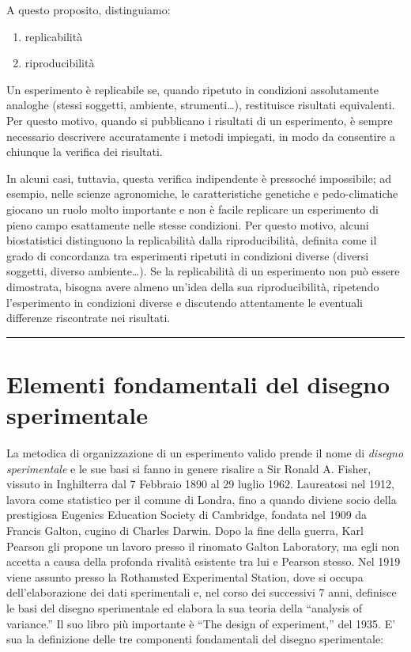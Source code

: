 \documentclass[a4paper,12pt,oneside]{book}
\providecommand{\tightlist}{%
  \setlength{\itemsep}{0pt}\setlength{\parskip}{0pt}}
\begin{document}
A questo proposito, distinguiamo:

\begin{enumerate}
\def\labelenumi{\arabic{enumi}.}
\tightlist
\item
  replicabilità
\item
  riproducibilità
\end{enumerate}

Un esperimento è replicabile se, quando ripetuto in condizioni assolutamente analoghe (stessi soggetti, ambiente, strumenti\ldots), restituisce risultati equivalenti. Per questo motivo, quando si pubblicano i risultati di un esperimento, è sempre necessario descrivere accuratamente i metodi impiegati, in modo da consentire a chiunque la verifica dei risultati.

In alcuni casi, tuttavia, questa verifica indipendente è pressoché impossibile; ad esempio, nelle scienze agronomiche, le caratteristiche genetiche e pedo-climatiche giocano un ruolo molto importante e non è facile replicare un esperimento di pieno campo esattamente nelle stesse condizioni. Per questo motivo, alcuni biostatistici distinguono la replicabilità dalla riproducibilità, definita come il grado di concordanza tra esperimenti ripetuti in condizioni diverse (diversi soggetti, diverso ambiente\ldots). Se la replicabilità di un esperimento non può essere dimostrata, bisogna avere almeno un'idea della sua riproducibilità, ripetendo l'esperimento in condizioni diverse e discutendo attentamente le eventuali differenze riscontrate nei risultati.

\begin{center}\rule{0.5\linewidth}{0.5pt}\end{center}

\hypertarget{elementi-fondamentali-del-disegno-sperimentale}{%
\section{Elementi fondamentali del disegno sperimentale}\label{elementi-fondamentali-del-disegno-sperimentale}}

La metodica di organizzazione di un esperimento valido prende il nome di \emph{disegno sperimentale} e le sue basi si fanno in genere risalire a Sir Ronald A. Fisher, vissuto in Inghilterra dal 7 Febbraio 1890 al 29 luglio 1962. Laureatosi nel 1912, lavora come statistico per il comune di Londra, fino a quando diviene socio della prestigiosa Eugenics Education Society di Cambridge, fondata nel 1909 da Francis Galton, cugino di Charles Darwin. Dopo la fine della guerra, Karl Pearson gli propone un lavoro presso il rinomato Galton Laboratory, ma egli non accetta a causa della profonda rivalità esistente tra lui e Pearson stesso. Nel 1919 viene assunto presso la Rothamsted Experimental Station, dove si occupa dell'elaborazione dei dati sperimentali e, nel corso dei successivi 7 anni, definisce le basi del disegno sperimentale ed elabora la sua teoria della ``analysis of variance.'' Il suo libro più importante è ``The design of experiment,'' del 1935. E' sua la definizione delle tre componenti fondamentali del disegno sperimentale:
\end{document}
